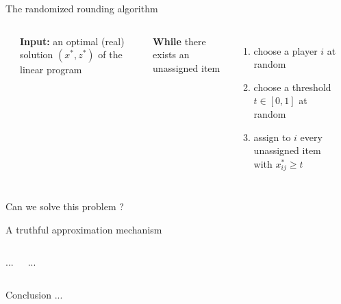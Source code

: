 \documentclass[aspectratio=169]{beamer}
\begin{document}
\begin{frame}{The randomized rounding algorithm}
    \begin{columns}
        \hrule
        \vspace{.1cm}
        \textbf{Input:} an optimal (real) solution \((x^*, z^*)\) of the linear program

        \vspace{.5cm}
        \textbf{While} there exists an unassigned item
        \begin{enumerate}
            \item choose a player \(i\) at random
            \item choose a threshold \(t \in [0, 1]\) at random
            \item assign to \(i\) every unassigned item with \(x_{ij}^* \geqslant t\)
        \end{enumerate}
        \hrule

    \end{columns}
\end{frame}

\begin{frame}[standout]
    Can we solve this problem ?
\end{frame}

\begin{frame}{A truthful approximation mechanism}
    \begin{columns}
        ...

        ...
    \end{columns}
\end{frame}

\begin{frame}{Conclusion}
    ...
\end{frame}
\end{document}
